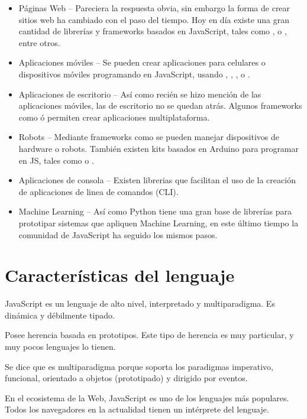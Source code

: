 \begin{itemize}
	\item Páginas Web -- Pareciera la respuesta obvia, sin embargo la forma de crear sitios web ha cambiado con el paso del tiempo. Hoy en día existe una gran cantidad de librerías y frameworks basados en JavaScript, tales como ,  o , entre otros.
	\item Aplicaciones móviles -- Se pueden crear aplicaciones para celulares o dispositivos móviles programando en JavaScript, usando , , ,  o .
	\item Aplicaciones de escritorio -- Así como recién se hizo mención de las aplicaciones móviles, las de escritorio no se quedan atrás. Algunos frameworks como  ó  permiten crear aplicaciones multiplataforma.
	\item Robots -- Mediante frameworks como  se pueden manejar dispositivos de hardware o robots. También existen kits basados en Arduino para programar en JS, tales como  o .
	\item Aplicaciones de consola -- Existen librerias que facilitan el uso de la creación de aplicaciones de linea de comandos (CLI).
	\item Machine Learning -- Así como Python tiene una gran base de librerías para prototipar sistemas que apliquen Machine Learning, en este último tiempo la comunidad de JavaScript ha seguido los mismos pasos.
\end{itemize}



\section{Características del lenguaje}

JavaScript es un lenguaje de alto nivel, interpretado y multiparadigma. Es dinámica y débilmente tipado. 

Posee herencia basada en prototipos. Este tipo de herencia es muy particular, y muy pocos lenguajes lo tienen. 

Se dice que es multiparadigma porque soporta los paradigmas imperativo, funcional, orientado a objetos (prototipado) y dirigido por eventos.

En el ecosistema de la Web, JavaScript es uno de los lenguajes más populares. Todos los navegadores en la actualidad tienen un intérprete del lenguaje.

